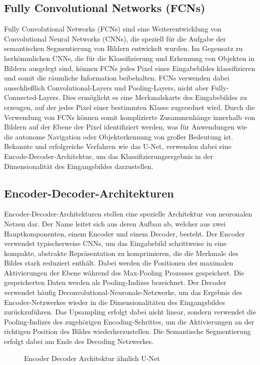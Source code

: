 \subsection{Fully Convolutional Networks (FCNs)}
Fully Convolutional Networks (FCNs) sind eine Weiterentwicklung von
Convolutional Neural Networks (CNNs), die speziell für die Aufgabe der
semantischen Segmentierung von Bildern entwickelt wurden. Im Gegensatz zu
herkömmlichen CNNs, die für die Klassifizierung und Erkennung von Objekten in
Bildern ausgelegt sind, können FCNs jedes Pixel eines Eingabebildes
klassifizieren und somit die räumliche Information beibehalten. FCNs verwenden
dabei ausschließlich Convolutional-Layers und Pooling-Layers, nicht aber
Fully-Connected-Layers. Dies ermöglicht es eine Merkmalskarte des Eingabebildes
zu erzeugen, auf der jedes Pixel einer bestimmten Klasse zugeordnet wird. Durch
die Verwendung von FCNs können somit komplizierte Zusammenhänge innerhalb von
Bildern auf der Ebene der Pixel identifiziert werden, was für Anwendungen wie
die autonome Navigation oder Objekterkennung von großer Bedeutung ist.
\cite{7803544} Bekannte und erfolgreiche Verfahren wie das U-Net, verwenden
dabei eine Encode-Decoder-Architektur, um das Klassifizierungsergebnis in der
Dimensionalität des Eingangsbildes darzustellen.

\subsection{Encoder-Decoder-Architekturen}
Encoder-Decoder-Architekturen stellen eine spezielle Architektur von neuronalen
Netzen dar. Der Name leitet sich aus deren Aufbau ab, welcher aus zwei
Hauptkomponenten, einem Encoder und einem Decoder, besteht. Der Encoder
verwendet typischerweise CNNs, um das Eingabebild schrittweise in eine
kompakte, abstrakte Repräsentation zu komprimieren, die die Merkmale des Bildes
stark reduziert enthält. Dabei werden die Positionen der maximalen
Aktivierungen der Ebene während des Max-Pooling Prozesses gespeichert. Die
gespeicherten Daten werden als Pooling-Indizes bezeichnet. Der Decoder
verwendet häufig Deconvolutional-Neuronale-Netzwerke, um das Ergebnis des
Encoder-Netzwerkes wieder in die Dimensionalitäten des Eingangsbildes
zurückzuführen. Das Upsampling erfolgt dabei nicht linear, sondern verwendet
die Pooling-Indizes des zugehörigen Encoding-Schrittes, um die Aktivierungen an
der richtigen Position des Bildes wiederherzustellen.
Die Semantische
Segmentierung erfolgt dabei am Ende des Decoding Netzwerkes. \cite{7803544}
\begin{figure}
    \centering
       
    \caption{Encoder Decoder Architektur ähnlich U-Net}
    \label{fig:meinbild}
\end{figure}

